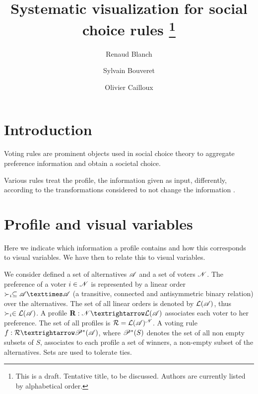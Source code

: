 \documentclass[version=last, pagesize, twoside=off, bibliography=totoc, DIV=calc, fontsize=12pt, a4paper, french, english]{scrartcl}
\begin{document}
\title{%
	\texorpdfstring{
		Systematic visualization for social choice rules%
		\thanks{
			This is a draft. Tentative title, to be discussed. Authors are currently listed by alphabetical order.
		}
	}{%
		Systematic visualization for social choice rules
	}
}
\author{Renaud Blanch}
\author{Sylvain Bouveret}
\author{Olivier Cailloux}
\maketitle

\section{Introduction}
\label{sec:intro}
Voting rules are prominent objects used in social choice theory to aggregate preference information and obtain a societal choice.

Various rules treat the profile, the information given as input, differently, according to the transformations considered to not change the information \citep{sen_social_1986, sen_informational_1974, sen_weights_1977, blackorby_social_1984}.

\section{Profile and visual variables}
Here we indicate which information a profile contains and how this corresponds to visual variables.
We have then to relate this to visual variables.

We consider defined a set of alternatives $\mathscr{A}$ and a set of voters $\mathscr{N}$. The preference of a voter $i \in \mathscr{N}$ is represented by a linear order $\pref_i \subseteq \allalts × \allalts$ (a transitive, connected and antisymmetric binary relation) over the alternatives. The set of all linear orders is denoted by $\mathcal{L}(\mathscr{A})$, thus $\succ_i \in \mathcal{L}(\mathscr{A})$. A profile $\prof: \allvoters → \linors$ associates each voter to her preference. The set of all profiles is $\mathcal{R} = \mathcal{L}(\mathscr{A})^{\mathscr{N}}$. A voting rule $f: \allprofs → \powersetz{\allalts}$, where $\mathscr{P}^*(S)$ denotes the set of all non empty subsets of $S$, associates to each profile a set of winners, a non-empty subset of the alternatives. Sets are used to tolerate ties.
\end{document}
